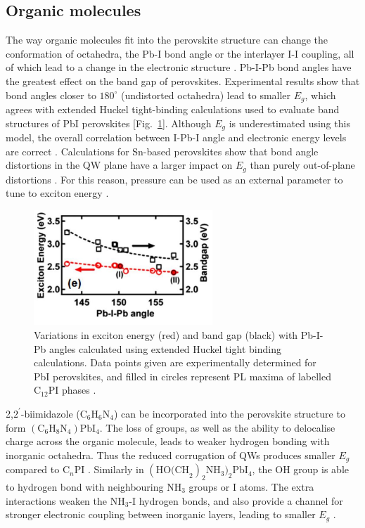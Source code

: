 \subsection{Organic molecules}
The way organic molecules fit into the perovskite structure can change the conformation of  octahedra, the Pb-I bond angle or the interlayer I-I coupling, all of which lead to a change in the electronic structure \cite{Sourisseau2007}. Pb-I-Pb bond angles have the greatest effect on the band gap of perovskites. Experimental results show that bond angles closer to $180^{\circ}$ (undistorted octahedra) lead to smaller $E_g$, which agrees with extended Huckel tight-binding calculations used to evaluate band structures of PbI perovskites [Fig.\ \ref{2Fig19}]. Although $E_g$ is underestimated using this model, the overall correlation between I-Pb-I angle and electronic energy levels are correct \cite{Pradeesh2009}. Calculations for Sn-based perovskites show that bond angle distortions in the QW plane have a larger impact on $E_g$ than purely out-of-plane distortions \cite{Knutson2005}. For this reason, pressure can be used as an external parameter to tune to exciton energy \cite{Matsuishi2001}.
\begin{figure}[h!]
\centering
\includegraphics[width=0.6\textwidth]{Fig19}
\caption{Variations in exciton energy (red) and band gap (black) with Pb-I-Pb angles calculated using extended Huckel tight binding calculations. Data points given are experimentally determined for PbI perovskites, and filled in circles represent PL maxima of labelled $\textrm{C}_{12}$PI phases \cite{Pradeesh2009}.}
\label{2Fig19}
\end{figure}

2,$2^{'}$-biimidazole ($\textrm{C}_6\textrm{H}_6\textrm{N}_4$) can be incorporated into the perovskite structure to form $(\textrm{C}_6\textrm{H}_8\textrm{N}_4)\textrm{PbI}_4$. The loss of  groups, as well as the ability to delocalise charge across the organic molecule, leads to weaker hydrogen bonding with inorganic octahedra. Thus the reduced corrugation of QWs produces smaller $E_g$ compared to C$_n$PI \cite{Tang2001}. Similarly in $(\textrm{HO(CH}_2)_2\textrm{NH}_3)_2\textrm{PbI}_4$, the OH group is able to hydrogen bond with neighbouring $\textrm{NH}_3$ groups or I atoms. The extra interactions weaken the $\textrm{NH}_3$-I hydrogen bonds, and also provide a channel for stronger electronic coupling between inorganic layers, leading to smaller $E_g$ \cite{Mercier2004}.


